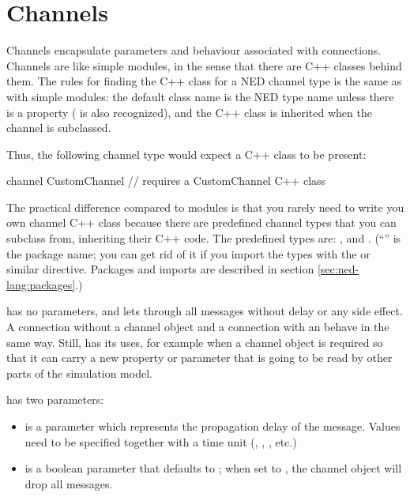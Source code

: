 \section{Channels}
\label{sec:ned-lang:channels}

Channels encapsulate parameters and behaviour associated with connections.
Channels are like simple modules, in the sense that there are C++ classes
behind them. The rules for finding the C++ class for a NED channel type is
the same as with simple modules: the default class name is the NED type
name unless there is a  property ( is also
recognized), and the C++ class is inherited when the channel is subclassed.

Thus, the following channel type would expect a  C++ class
to be present:

\begin{ned}
channel CustomChannel  // requires a CustomChannel C++ class
{
}
\end{ned}

The practical difference compared to modules is that you rarely need to write you own
channel C++ class because there are predefined channel types that you can
subclass from, inheriting their C++ code. The predefined types are:
,  and .
(``'' is the package name; you can get rid of it if you import the types
with the  or similar directive. Packages and imports
are described in section \ref{sec:ned-lang:packages}.)

 has no parameters, and lets through all messages without
delay or any side effect. A connection without a channel object
and a connection with an  behave in the same way.
Still,  has its uses, for example when a channel object
is required so that it can carry a new property or parameter that is
going to be read by other parts of the simulation model.

 has two parameters:

\begin{itemize}
    \item {} is a  parameter which represents the
          propagation delay of the message. Values need to be specified
          together with a time unit (, , , etc.)
    \item {} is a boolean parameter that defaults to ;
          when set to , the channel object will drop all messages.
\end{itemize}

